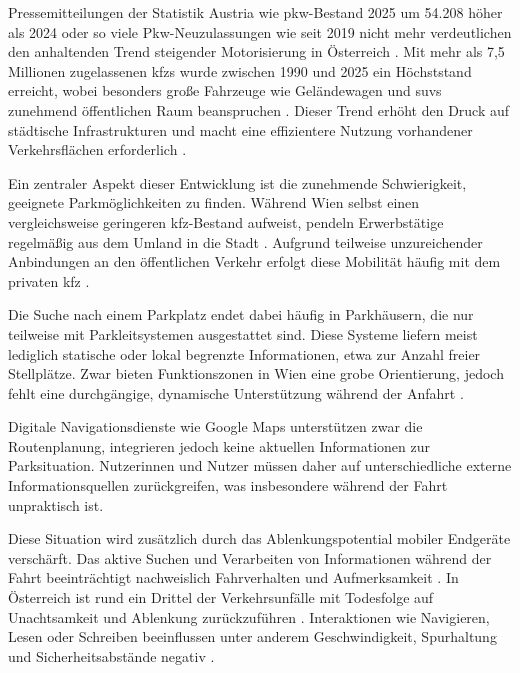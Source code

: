 Pressemitteilungen der Statistik Austria wie \glqq \acs{pkw}-Bestand 2025 um 54.208 höher als 2024\grqq{} oder  so viele Pkw-Neuzulassungen wie seit 2019 nicht mehr\grqq{} verdeutlichen den anhaltenden Trend steigender Motorisierung in Österreich \parencites[S. 1]{statistikaustriaPkwBestand2025Um2026}[S. 1]{statistikaustria2025VielePkwNeuzulassungen2026}.
Mit mehr als 7,5 Millionen zugelassenen \acp{kfz} wurde zwischen 1990 und 2025 ein Höchststand erreicht, wobei besonders große Fahrzeuge wie Geländewagen und \acp{suv} zunehmend öffentlichen Raum beanspruchen \parencite{hatzlDatenZeigenImmer2025}.
Dieser Trend erhöht den Druck auf städtische Infrastrukturen und macht eine effizientere Nutzung vorhandener Verkehrsflächen erforderlich \parencite{jaschinskyWarumOsterreichsStadte2025}.

Ein zentraler Aspekt dieser Entwicklung ist die zunehmende Schwierigkeit, geeignete Parkmöglichkeiten zu finden.
Während Wien selbst einen vergleichsweise geringeren \acs{kfz}-Bestand aufweist, pendeln Erwerbstätige regelmäßig aus dem Umland in die Stadt \parencite{statistikaustriaKfzBestand2026}.
Aufgrund teilweise unzureichender Anbindungen an den öffentlichen Verkehr erfolgt diese Mobilität häufig mit dem privaten \acs{kfz} \parencite{aknoAKNiederosterreichPendleranalyse20252025}.

Die Suche nach einem Parkplatz endet dabei häufig in Parkhäusern, die nur teilweise mit Parkleitsystemen ausgestattet sind.
Diese Systeme liefern meist lediglich statische oder lokal begrenzte Informationen, etwa zur Anzahl freier Stellplätze.
Zwar bieten Funktionszonen in Wien eine grobe Orientierung, jedoch fehlt eine durchgängige, dynamische Unterstützung während der Anfahrt \parencite{stadtwienParkleitsystemFuerWien2026}.

Digitale Navigationsdienste wie Google Maps unterstützen zwar die Routenplanung, integrieren jedoch keine aktuellen Informationen zur Parksituation.
Nutzerinnen und Nutzer müssen daher auf unterschiedliche externe Informationsquellen zurückgreifen, was insbesondere während der Fahrt unpraktisch ist.

Diese Situation wird zusätzlich durch das Ablenkungspotential mobiler Endgeräte verschärft.
Das aktive Suchen und Verarbeiten von Informationen während der Fahrt beeinträchtigt nachweislich Fahrverhalten und Aufmerksamkeit \parencite[S. 361]{oviedo-trespalaciosUnderstandingImpactsMobile2016}.
In Österreich ist rund ein Drittel der Verkehrsunfälle mit Todesfolge auf Unachtsamkeit und Ablenkung zurückzuführen \parencite{bmi397VerkehrstoteAuf2026}.
Interaktionen wie Navigieren, Lesen oder Schreiben beeinflussen unter anderem Geschwindigkeit, Spurhaltung und Sicherheitsabstände negativ \parencite[S. 372-373]{oviedo-trespalaciosUnderstandingImpactsMobile2016}.

